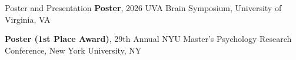 \begin{rubric}{Poster and Presentation}
\entry*[May 2026]%
    \textbf{Poster}, 2026 UVA Brain Symposium, University of Virginia, VA

\entry*[Apr 2025]%
    \textbf{Poster (1st Place Award)}, 29th Annual NYU Master's Psychology Research Conference, New York University, NY
%
\end{rubric}
